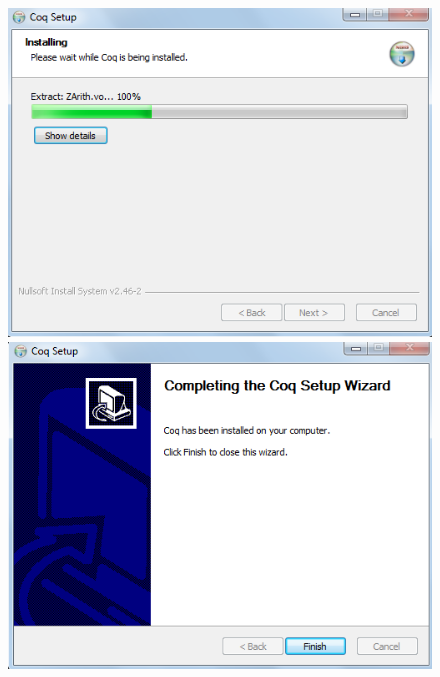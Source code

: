 \begin{flushleft}
\begin{figure}[!htb]
\includegraphics[scale=0.4]{imagens/6.png}
\includegraphics[scale=0.4]{imagens/7.png}
\end{figure}
\end{flushleft}
